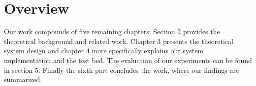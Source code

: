 \section{Overview}

Our work compounds of five remaining chapters:
Section 2 provides the theoretical background and related work. Chapter 3 presents the theoretical system design and chapter 4 more specifically explains our system implementation and the test bed. The evaluation of our experiments can be found in section 5. Finally the sixth part concludes the work, where our findings are summarized.